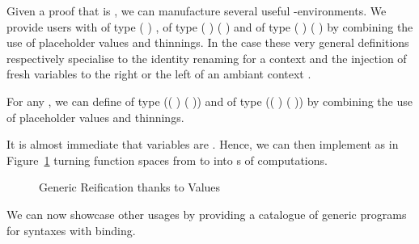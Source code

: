 \label{sec:varlike:base}
Given a proof that  is , we can manufacture
several useful -environments. We provide users with
 of type {( )  },
 of type {( )  ( \AF{++} )}
and  of type {( )  ( \AF{++} )}
by combining the use of placeholder values and thinnings.
In the  case these very general definitions respectively specialise
to the identity renaming for a context  and the injection of 
fresh variables to the right or the left of an ambiant context .

For any  , we can define  of
type {(( )  ( \AF{++} ))} and  of
type {(( )  ( \AF{++} ))} by combining the use
of placeholder values and thinnings.

It is almost immediate that variables are . Hence, we can
then implement  as in Figure~\ref{fig:kripkereify} turning
 function spaces from  to  into s of
 computations.

\begin{figure}[h]
\caption{Generic Reification thanks to  Values\label{fig:kripkereify}}
\end{figure}

We can now showcase other usages by providing a catalogue of generic programs
for syntaxes with binding.



